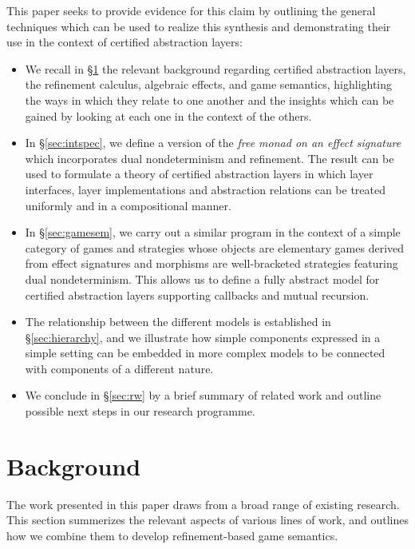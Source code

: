 \documentclass[format=sigplan,authordraft]{acmart}
\begin{document}
This paper seeks to provide evidence for this claim
by outlining the general techniques
which can be used to realize this synthesis
and demonstrating their use
in the context of certified abstraction layers:
\begin{itemize}
\item
  We recall in \S\ref{sec:background}
  the relevant background regarding
  certified abstraction layers,
  the refinement calculus,
  algebraic effects, and
  game semantics,
  highlighting the ways in which
  they relate to one another
  and the insights which can be gained
  by looking at each one in the context of the others.
\item
  In \S\ref{sec:intspec},
  we define a version of the
  \emph{free monad on an effect signature}
  which incorporates dual nondeterminism and refinement.
  The result can be used to formulate a theory of certified abstraction
  layers in which
  layer interfaces, layer implementations and abstraction relations
  can be treated uniformly
  and in a compositional manner.
\item
  In \S\ref{sec:gamesem},
  we carry out a similar program
  in the context of a simple category of games and strategies
  whose objects are elementary games derived from effect signatures
  and morphisms are well-bracketed strategies
  featuring dual nondeterminism.
  This allows us to define
  a fully abstract model for certified abstraction layers
  supporting callbacks and mutual recursion.
\item
  The relationship between the different models
  is established in \S\ref{sec:hierarchy},
  and we illustrate how simple components
  expressed in a simple setting
  can be embedded in more complex models
  to be connected with components of a different nature.
\item
  We conclude in \S\ref{sec:rw}
  by a brief summary of related work
  and outline possible next steps
  in our research programme.
\end{itemize}


\section{Background} \label{sec:background} %


The work presented in this paper
draws from a broad range of existing research.
This section summerizes the relevant aspects
of various lines of work,
and outlines how we combine them
to develop
refinement-based game semantics.
\end{document}
